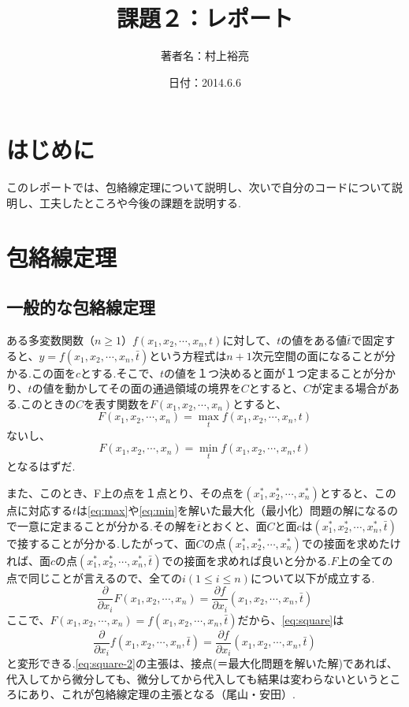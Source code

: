 \documentclass[11pt,a4j,fleqn]{jarticle}
\title{課題２：レポート}
\author{著者名：村上裕亮}
\date{日付：2014.6.6}
\begin{document}
\maketitle

\section{はじめに}

このレポートでは、包絡線定理について説明し、次いで自分のコードについて説明し、工夫したところや今後の課題を説明する.

\section{包絡線定理}

\subsection{一般的な包絡線定理}
ある多変数関数（$n\geq1$）$f(x_1,x_2,\cdots,x_n,t)$に対して、$t$の値をある値$\bar{t}$で固定すると、$y=f(x_1,x_2,\cdots,x_n,\bar{t})$という方程式は$n+1$次元空間の面になることが分かる.この面を$c$とする.そこで、$t$の値を１つ決めると面が１つ定まることが分かり、$t$の値を動かしてその面の通過領域の境界を$C$とすると、$C$が定まる場合がある.このときの$C$を表す関数を$F(x_1,x_2,\cdots,x_n)$とすると、
\begin{equation}
 F(x_1,x_2,\cdots,x_n)=\max_t f(x_1,x_2,\cdots,x_n,t)\label{eq:max}
\end{equation}
ないし、
\begin{equation}
 F(x_1,x_2,\cdots,x_n)=\min_t f(x_1,x_2,\cdots,x_n,t)\label{eq:min}
\end{equation}
となるはずだ.

また、このとき、F上の点を１点とり、その点を$(x_1^*,x_2^*,\cdots,x_n^*)$とすると、この点に対応する$t$は\eqref{eq:max}や\eqref{eq:min}を解いた最大化（最小化）問題の解になるので一意に定まることが分かる.その解を$\bar{t}$とおくと、面$C$と面$c$は$(x_1^*,x_2^*,\cdots,x_n^*,\bar{t})$で接することが分かる.したがって、面$C$の点$(x_1^*,x_2^*,\cdots,x_n^*)$での接面を求めたければ、面$c$の点$(x_1^*,x_2^*,\cdots,x_n^*,\bar{t})$での接面を求めれば良いと分かる.$F$上の全ての点で同じことが言えるので、全ての$i(1\leq i\leq n)$について以下が成立する.
\begin{equation}
 \frac{\partial}{\partial x_i}F(x_1,x_2,\cdots,x_n)=\frac{\partial f}{\partial x_i}(x_1,x_2,\cdots,x_n,\bar{t})\label{eq:square}
\end{equation}
ここで、$F(x_1,x_2,\cdots,x_n)=f(x_1,x_2,\cdots,x_n,\bar{t})$だから、\eqref{eq:square}は
\begin{equation}
 \frac{\partial}{\partial x_i}f(x_1,x_2,\cdots,x_n,\bar{t})=\frac{\partial f}{\partial x_i}(x_1,x_2,\cdots,x_n,\bar{t})\label{eq:square-2}
\end{equation}
と変形できる.\eqref{eq:square-2}の主張は、接点(＝最大化問題を解いた解)であれば、代入してから微分しても、微分してから代入しても結果は変わらないというところにあり、これが包絡線定理の主張となる（尾山・安田\cite{OyamaYasuda11}）.
\end{document}
